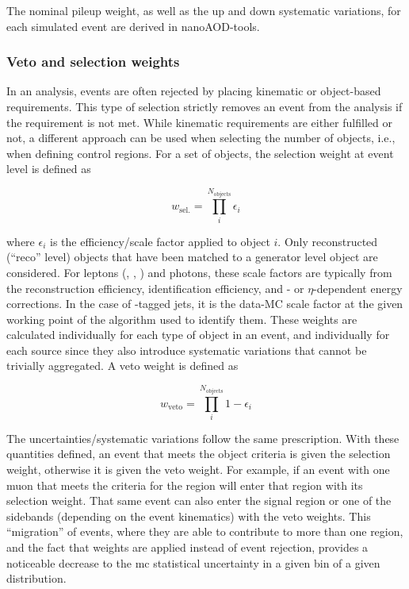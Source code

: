 The nominal pileup weight, as well as the up and down systematic variations, for each simulated event are derived in nanoAOD-tools. %




\subsubsection{Veto and selection weights}
\label{subsubsec:veto_sel_weights}

In an analysis, events are often rejected by placing kinematic or object-based requirements. This type of selection strictly removes an event from the analysis if the requirement is not met. While kinematic requirements are either fulfilled or not, a different approach can be used when selecting the number of objects, i.e., when defining control regions. For a set of objects, the selection weight at event level is defined as

\begin{equation}
    w_{\mathrm{sel.}} = \prod_i^{N_\mathrm{objects}} \epsilon_i
    \label{eq:event_selection_weight}
\end{equation}

where $\epsilon_i$ is the efficiency/scale factor applied to object $i$. Only reconstructed (``reco'' level) objects that have been matched to a generator level object are considered. For leptons (\Pe, \Pmu, \Ptau) and photons, these scale factors are typically from the reconstruction efficiency, identification efficiency, and \pt- or $\eta$-dependent energy corrections. In the case of \Pqb-tagged jets, it is the data-MC scale factor at the given working point of the algorithm used to identify them. These weights are calculated individually for each type of object in an event, and individually for each source since they also introduce systematic variations that cannot be trivially aggregated. A veto weight is defined as

\begin{equation}
    w_{\mathrm{veto}} = \prod_i^{N_\mathrm{objects}} 1 - \epsilon_i
    \label{eq:event_veto_weight}
\end{equation}

The uncertainties/systematic variations follow the same prescription. With these quantities defined, an event that meets the object criteria is given the selection weight, otherwise it is given the veto weight. For example, if an event with one muon that meets the criteria for the \singleMuCr region will enter that region with its selection weight. That same event can also enter the signal region or one of the sidebands (depending on the event kinematics) with the veto weights. This ``migration'' of events, where they are able to contribute to more than one region, and the fact that weights are applied instead of event rejection, provides a noticeable decrease to the \acrlong{mc} statistical uncertainty in a given bin of a given distribution.

